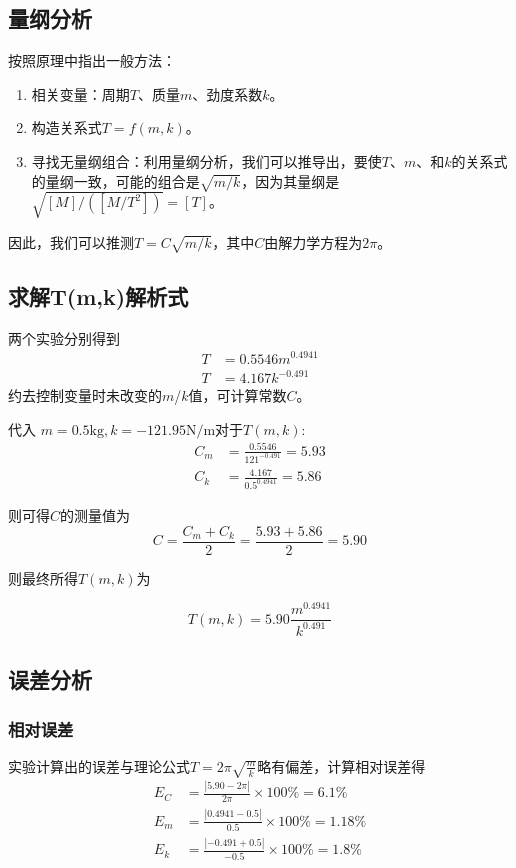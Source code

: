 \documentclass[a4paper,zihao=5,UTF8,fontset=fandol]{../phyreport}
\begin{document}
\subsection{量纲分析}
按照原理中指出一般方法：
\begin{enumerate}
	\item 相关变量：周期$T$、质量$m$、劲度系数$k$。
	\item 构造关系式$T=f(m,k)$。
	\item 寻找无量纲组合：利用量纲分析，我们可以推导出，要使$T$、$m$、和$k$的关系式的量纲一致，可能的组合是$\sqrt{m/k}$，因为其量纲是$\sqrt{[M]/([M/T^2])}=[T]$。
\end{enumerate}

因此，我们可以推测$T=C\sqrt{m/k}$，其中$C$由解力学方程为$2\pi$。

\subsection{求解T(m,k)解析式}

两个实验分别得到
\begin{align*}
	T & = 0.5546m^{0.4941}\\
	T & = 4.167 k^{-0.491}
\end{align*}
约去控制变量时未改变的$m$/$k$值，可计算常数$C$。

代入 $m=0.5\text{kg},k=-121.95\text{N/m}$对于$T(m,k)$:
\begin{align}
	C_m &= \frac{0.5546}{121^{-0.491}}=5.93\\
	C_k &= \frac{4.167}{0.5^{0.4941}}=5.86
\end{align}

则可得$C$的测量值为
\begin{equation}
	C= \frac{C_m+C_k}{2}=\frac{5.93+5.86}{2}=5.90
\end{equation}

则最终所得$T(m,k)$为

\begin{equation}
	T(m,k) = 5.90 \frac{m^{0.4941}}{k^{0.491}}
	\label{eq:tmk}
\end{equation}

\subsection{误差分析}
\subsubsection{相对误差}
实验计算出的误差与理论公式$T=2\pi \sqrt{\frac{m}{k}}$略有偏差，计算相对误差得
\begin{align}
	E_C & = \frac{\left|5.90-2\pi\right|}{2\pi} \times 100\% = 6.1\%                \\
	E_m & = \frac{\left|0.4941-0.5\right|}{0.5} \times 100\% = 1.18\%   \\
	E_k & = \frac{\left|-0.491+0.5\right|}{-0.5} \times 100\% = 1.8\%
\end{align}
\end{document}
